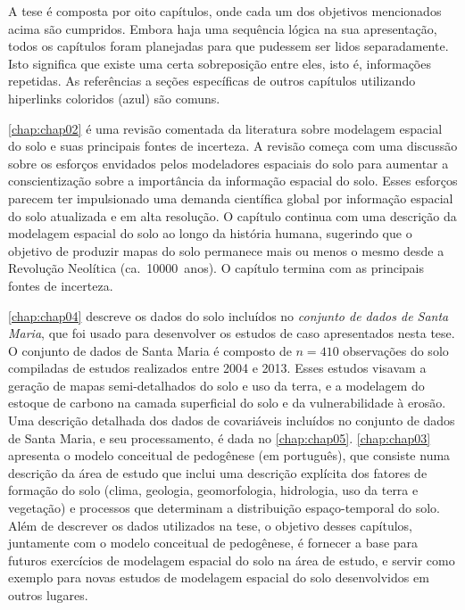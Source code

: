 A tese é composta por oito capítulos, onde cada um dos objetivos mencionados acima são cumpridos. Embora haja 
uma sequência lógica na sua apresentação, todos os capítulos foram planejadas para que pudessem ser lidos 
separadamente. Isto significa que existe uma certa sobreposição entre eles, isto é, informações repetidas. As 
referências a seções específicas de outros capítulos utilizando hiperlinks coloridos (azul) são comuns.

\autoref{chap:chap02} é uma revisão comentada da literatura sobre modelagem espacial do solo e suas principais 
fontes de incerteza. A revisão começa com uma discussão sobre os esforços envidados pelos modeladores espaciais 
do solo para aumentar a conscientização sobre a importância da informação espacial do solo. Esses esforços 
parecem ter impulsionado uma demanda científica global por informação espacial do solo atualizada e em alta 
resolução. O capítulo continua com uma descrição da modelagem espacial do solo ao longo da história humana, 
sugerindo que o objetivo de produzir mapas do solo permanece mais ou menos o mesmo desde a Revolução Neolítica 
(ca.~\num{10000}~anos). O capítulo termina com as principais fontes de incerteza.

\autoref{chap:chap04} descreve os dados do solo incluídos no \emph{conjunto de dados de Santa Maria}, que foi 
usado para desenvolver os estudos de caso apresentados nesta tese. O conjunto de dados de Santa Maria é 
composto de $n = 410$ observações do solo compiladas de estudos realizados entre 2004 e 2013. Esses estudos 
visavam a geração de mapas semi-detalhados do solo e uso da terra, e a modelagem do estoque de carbono na 
camada superficial do solo e da vulnerabilidade à erosão. Uma descrição detalhada dos dados de covariáveis 
incluídos no conjunto de dados de Santa Maria, e seu processamento, é dada no \autoref{chap:chap05}. 
\autoref{chap:chap03} apresenta o modelo conceitual de pedogênese (em português), que consiste numa descrição 
da área de estudo que inclui uma descrição explícita dos fatores de formação do solo (clima, geologia, 
geomorfologia, hidrologia, uso da terra e vegetação) e processos que determinam a distribuição espaço-temporal 
do solo. Além de descrever os dados utilizados na tese, o objetivo desses capítulos, juntamente com o modelo 
conceitual de pedogênese, é fornecer a base para futuros exercícios de modelagem espacial do solo na área de 
estudo, e servir como exemplo para novas estudos de modelagem espacial do solo desenvolvidos em outros lugares.

